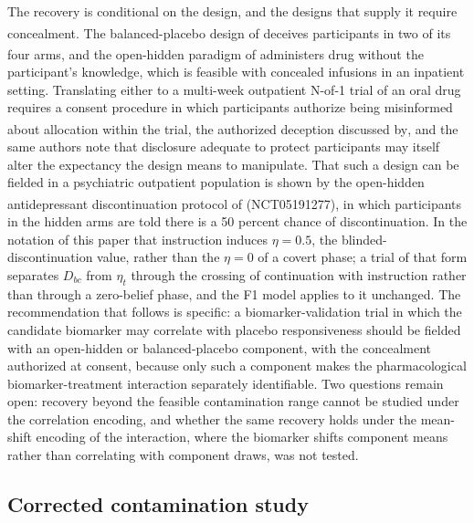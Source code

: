\documentclass[
  11pt,
]{article}
\begin{document}
The recovery is conditional on the design, and the designs that supply
it require concealment. The balanced-placebo design of\textsuperscript{}
deceives participants in two of its four arms, and the open-hidden
paradigm of\textsuperscript{} administers drug without the participant's
knowledge, which is feasible with concealed infusions in an inpatient
setting. Translating either to a multi-week outpatient N-of-1 trial of an
oral drug requires a consent procedure in which participants authorize
being misinformed about allocation within the trial, the authorized
deception discussed by\textsuperscript{}, and the same authors note
that disclosure adequate to protect participants may itself alter the
expectancy the design means to manipulate. That such a design can be
fielded in a psychiatric outpatient population is shown by the
open-hidden antidepressant discontinuation protocol of\textsuperscript{}
(NCT05191277), in which participants in the hidden arms are told there is
a 50 percent chance of discontinuation. In the notation of this paper
that instruction induces \(\eta = 0.5\), the blinded-discontinuation value,
rather than the \(\eta = 0\) of a covert phase; a trial of that form
separates \(D_{bc}\) from \(\eta_t\) through the crossing of
continuation with instruction rather than through a zero-belief phase,
and the F1 model applies to it unchanged. The recommendation that follows
is specific: a biomarker-validation trial in which the candidate
biomarker may correlate with placebo responsiveness should be fielded
with an open-hidden or balanced-placebo component, with the concealment
authorized at consent, because only such a component makes the
pharmacological biomarker-treatment interaction separately identifiable.
Two questions remain open: recovery beyond the feasible contamination
range cannot be studied under the correlation encoding, and whether the
same recovery holds under the mean-shift encoding of the interaction,
where the biomarker shifts component means rather than correlating with
component draws, was not tested.

\subsection{Corrected contamination study}\label{corrected-contamination-study}
\end{document}
